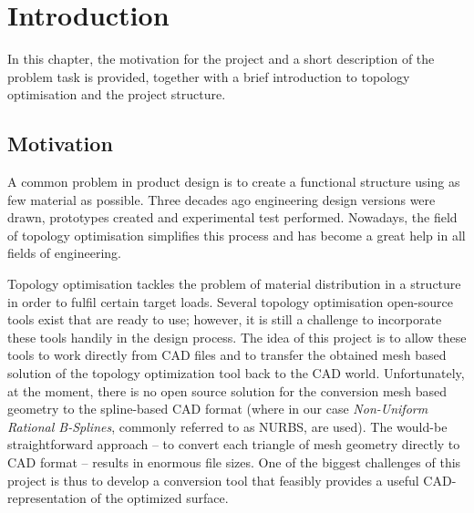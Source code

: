 \chapter{Introduction}
\label{chapter:Introduction}

In this chapter, the motivation for the project and a short description of the problem task is provided, together with a brief introduction to topology optimisation and the project structure.
\section{Motivation}
A common problem in product design is to create a functional structure using as few material as possible. Three decades ago engineering design versions were drawn, prototypes created and experimental test performed. Nowadays, the field of topology optimisation simplifies this process and has become a great help in all fields of engineering. 

Topology optimisation tackles the problem of material distribution in a structure in order to fulfil certain target loads. Several topology optimisation open-source tools exist that are ready to use; however, it is still a challenge to incorporate these tools handily in the design process. The idea of this project is to allow these tools to work directly from CAD files and to transfer the obtained mesh based solution of the topology optimization tool back to the CAD world. Unfortunately, at the moment, there is no open source solution for the conversion mesh based geometry to the spline-based CAD format (where in our case \emph{Non-Uniform Rational B-Splines}, commonly referred to as NURBS, are used). The would-be straightforward approach -- to convert each triangle of mesh geometry directly to CAD format -- results in enormous file sizes. One of the biggest challenges of this project is thus to develop a conversion tool that feasibly provides a useful CAD-representation of the optimized surface.


%
%

